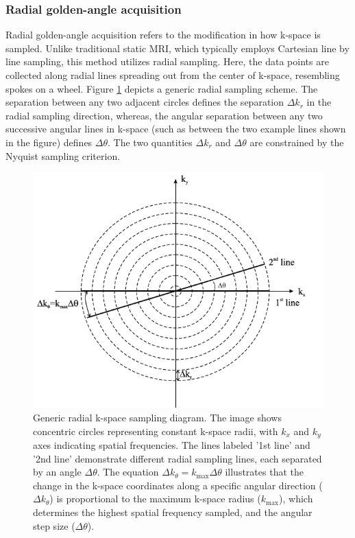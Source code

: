 \documentclass{micro-econ-thesis}
\begin{document}
\subsubsection{Radial golden-angle acquisition}


Radial golden-angle acquisition refers to the modification in how k-space is sampled. Unlike traditional static MRI, which typically employs Cartesian line by line sampling, this method utilizes radial sampling. Here, the data points are collected along radial lines spreading out from the center of k-space, resembling spokes on a wheel. Figure \ref{fig:radial} depicts a generic radial sampling scheme. The separation between any two adjacent circles defines the separation $\Delta k_r$ in the radial sampling direction, whereas, the angular separation between any two successive angular lines in k-space (such as between the two example lines shown in the figure) defines $\Delta \theta$. The two quantities $\Delta k_r$ and $\Delta \theta$ are constrained by the Nyquist sampling criterion. \parencite{brown_magnetic_2014} 
  
 \begin{figure}[H]
 	\centering
 	\includegraphics[width=0.7\linewidth]{radial}
 	\caption{Generic radial k-space sampling diagram. The image shows concentric circles representing constant k-space radii, with $k_x$ and $k_y$ axes indicating spatial frequencies. The lines labeled '1st line' and '2nd line' demonstrate different radial sampling lines, each separated by an angle $\Delta \theta$. The equation $\Delta k_{\theta} = k_{\text{max}} \Delta \theta$ illustrates that the change in the k-space coordinates along a specific angular direction ($\Delta k_{\theta}$) is proportional to the maximum k-space radius ($k_{\text{max}}$), which determines the highest spatial frequency sampled, and the angular step size ($\Delta \theta$).
 		 \parencite[p.306]{brown_magnetic_2014}}
 	\label{fig:radial}
 \end{figure}
 
\end{document}
